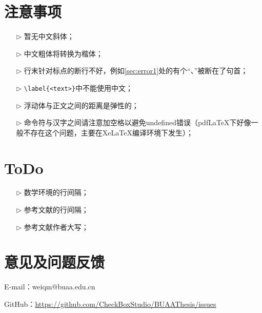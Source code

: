 \section{注意事项}
\begin{itemize}
  \item[$\triangleright$] 暂无中文斜体；
  \item[$\triangleright$] 中文粗体将转换为楷体；
  \item[$\triangleright$] 行末针对标点的断行不好，例如\ref{sec:error1}处的有个“、”被断在了句首；
  \item[$\triangleright$] \verb|\label{<text>}|中不能使用中文；
  \item[$\triangleright$] 浮动体与正文之间的距离是弹性的；
  \item[$\triangleright$] 命令符与汉字之间请注意加空格以避免undefined错误（pdfLaTeX下好像一般不存在这个问题，主要在XeLaTeX编译环境下发生）；
\end{itemize}

\section{ToDo}
\begin{itemize}
  \item[$\triangleright$] 数学环境的行间隔；
  \item[$\triangleright$] 参考文献的行间隔；
  \item[$\triangleright$] 参考文献作者大写；
\end{itemize}

\section{意见及问题反馈}

\indent E-mail：weiqm@buaa.edu.cn

\indent GitHub：\href{https://github.com/CheckBoxStudio/BUAAThesis/issues}{https://github.com/CheckBoxStudio/BUAAThesis/issues}


